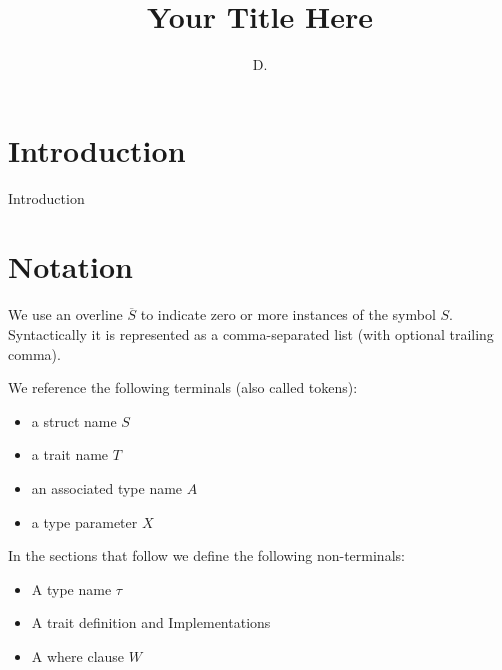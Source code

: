 \documentclass[sn-mathphys-num]{sn-jnl}%
\theoremstyle{thmstyleone}%
\theoremstyle{thmstyletwo}%
\theoremstyle{thmstylethree}%
\begin{document}
\title[Your Title Here]{Your Title Here}


\author{ D. }




\maketitle

\section{Introduction}\label{sec1}

Introduction

\section{Notation}

We use an overline $\overline{S}$ to indicate zero or more instances of the symbol $S$.
Syntactically it is represented as a comma-separated list (with optional trailing comma).

We reference the following terminals (also called tokens):

\begin{itemize}
    \item a struct name $S$
    \item a trait name $T$
    \item an associated type name $A$
    \item a type parameter $X$
\end{itemize}

In the sections that follow we define the following non-terminals:

\begin{itemize}
    \item A type name $\tau$
    \item A trait definition and Implementations
    \item A where clause $W$
\end{itemize}
\end{document}
